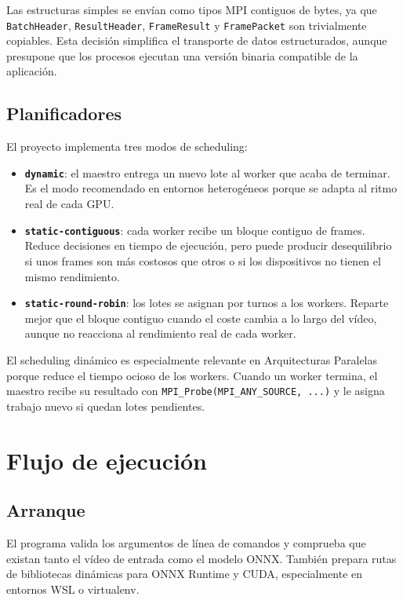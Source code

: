 \documentclass[12pt,a4paper]{article}
\begin{document}
Las estructuras simples se env\'ian como tipos MPI contiguos de bytes, ya que
\texttt{BatchHeader}, \texttt{ResultHeader}, \texttt{FrameResult} y \texttt{FramePacket} son
trivialmente copiables. Esta decisi\'on simplifica el transporte de datos estructurados, aunque
presupone que los procesos ejecutan una versi\'on binaria compatible de la aplicaci\'on.

\subsection{Planificadores}

El proyecto implementa tres modos de scheduling:

\begin{itemize}
    \item \textbf{\texttt{dynamic}}: el maestro entrega un nuevo lote al worker que acaba de
    terminar. Es el modo recomendado en entornos heterog\'eneos porque se adapta al ritmo real
    de cada GPU.
    \item \textbf{\texttt{static-contiguous}}: cada worker recibe un bloque contiguo de frames.
    Reduce decisiones en tiempo de ejecuci\'on, pero puede producir desequilibrio si unos
    frames son m\'as costosos que otros o si los dispositivos no tienen el mismo rendimiento.
    \item \textbf{\texttt{static-round-robin}}: los lotes se asignan por turnos a los workers.
    Reparte mejor que el bloque contiguo cuando el coste cambia a lo largo del v\'ideo, aunque
    no reacciona al rendimiento real de cada worker.
\end{itemize}

El scheduling din\'amico es especialmente relevante en Arquitecturas Paralelas porque reduce
el tiempo ocioso de los workers. Cuando un worker termina, el maestro recibe su resultado con
\texttt{MPI\_Probe(MPI\_ANY\_SOURCE, ...)} y le asigna trabajo nuevo si quedan lotes pendientes.

\section{Flujo de ejecuci\'on}

\subsection{Arranque}

El programa valida los argumentos de l\'inea de comandos y comprueba que existan tanto el
v\'ideo de entrada como el modelo ONNX. Tambi\'en prepara rutas de bibliotecas din\'amicas para
ONNX Runtime y CUDA, especialmente en entornos WSL o virtualenv.
\end{document}
